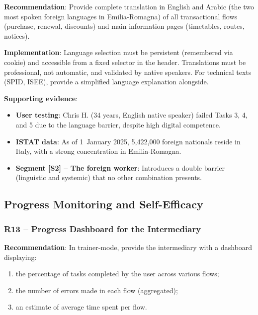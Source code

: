 ﻿\documentclass[11pt,a4paper]{article}
\begin{document}
\textbf{Recommendation}: Provide complete translation in English and Arabic
(the two most spoken foreign languages in Emilia-Romagna) of all transactional
flows (purchase, renewal, discounts) and main information
pages (timetables, routes, notices).

\textbf{Implementation}: Language selection must be persistent
(remembered via cookie) and accessible from a fixed selector in the header.
Translations must be professional, not automatic, and validated by
native speakers. For technical texts (SPID, ISEE), provide a simplified
language explanation alongside.

\textbf{Supporting evidence}:
\begin{itemize}
    \item \textbf{User testing}: Chris H. (34 years, English native speaker) failed
    Tasks 3, 4, and 5 due to the language barrier, despite
    high digital competence.
    \item \textbf{ISTAT data}: As of 1\textdegree\ January 2025, 5,422,000
    foreign nationals reside in Italy, with a strong concentration in Emilia-Romagna.
    \item \textbf{Segment [S2] -- The foreign worker}: Introduces
    a double barrier (linguistic and systemic) that no other
    combination presents.
\end{itemize}




\subsection{Progress Monitoring and Self-Efficacy}

\subsubsection{R13 -- Progress Dashboard for the Intermediary}
\label{rec:R13}

\textbf{Recommendation}: In trainer-mode, provide the intermediary with a
dashboard displaying:
\begin{enumerate}
    \item the percentage of tasks completed by the user across various flows;
    \item the number of errors made in each flow (aggregated);
    \item an estimate of average time spent per flow.
\end{enumerate}
\end{document}
